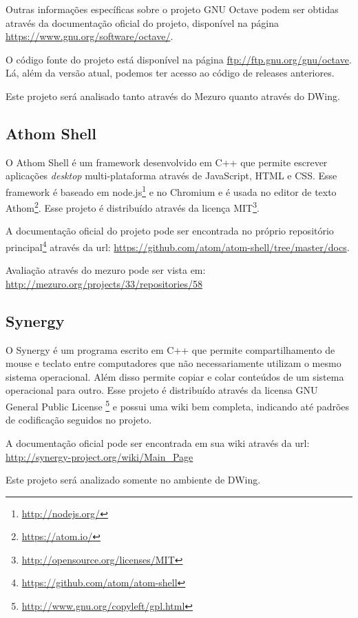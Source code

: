 Outras informações específicas sobre o projeto GNU Octave podem ser obtidas através da documentação oficial do projeto, disponível na página \url{https://www.gnu.org/software/octave/}.

O código fonte do projeto está disponível na página \url{ftp://ftp.gnu.org/gnu/octave}. Lá, além da versão atual, podemos ter acesso ao código de releases anteriores.

Este projeto será analisado tanto através do Mezuro quanto através do DWing.


\subsection{Athom Shell}
\label{section-athom}

O Athom Shell é um framework desenvolvido em C++ que permite escrever aplicações \emph{desktop} multi-plataforma através de JavaScript, HTML e CSS. Esse framework é baseado em node.js\footnote{\url{http://nodejs.org/}} e no Chromium e é usada no editor de texto Athom\footnote{\url{https://atom.io/}}. Esse projeto é distribuído através da licença MIT\footnote{\url{http://opensource.org/licenses/MIT}}.

A documentação oficial do projeto pode ser encontrada no próprio repositório principal\footnote{\url{https://github.com/atom/atom-shell}} através da url: \url{https://github.com/atom/atom-shell/tree/master/docs}.

Avaliação através do mezuro pode ser vista em: \url{http://mezuro.org/projects/33/repositories/58}

\subsection{Synergy}
\label{section-synergy}

O Synergy é um programa escrito em C++ que permite compartilhamento de mouse e teclato entre computadores que não necessariamente utilizam o mesmo sistema operacional. Além disso permite copiar e colar conteúdos de um sistema operacional para outro. Esse projeto é distribuído através da licensa GNU General Public License \footnote{\url{http://www.gnu.org/copyleft/gpl.html}} e possui uma wiki bem completa, indicando até padrões de codificação seguidos no projeto.

A documentação oficial pode ser encontrada em sua wiki através da url: \url{http://synergy-project.org/wiki/Main_Page}

Este projeto será analizado somente no ambiente de DWing.

